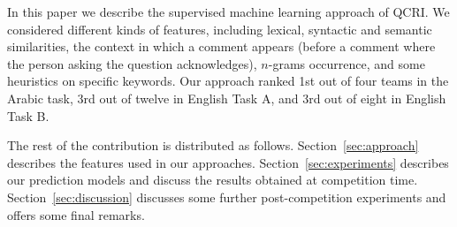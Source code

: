 In this paper we describe the supervised machine learning approach of QCRI. We 
considered different kinds of features, including lexical, syntactic and 
semantic similarities, the context in which a comment appears (\eg before a 
comment where the person asking the question acknowledges), $n$-grams 
occurrence, and some heuristics on specific keywords. Our approach ranked 1st 
out of four teams in the Arabic task, 3rd out of twelve in English Task A, and 
3rd out of eight in English Task B. 

The rest of the contribution is distributed as follows. 
Section~\ref{sec:approach} describes the features used in our approaches. 
Section~\ref{sec:experiments} describes our prediction models and discuss the 
results obtained at competition time. Section~\ref{sec:discussion} discusses 
some further post-competition experiments and offers some final remarks.

